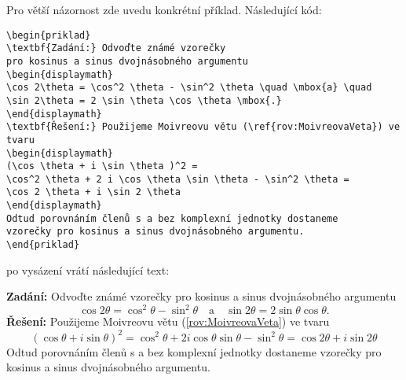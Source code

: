 Pro větší názornost zde uvedu konkrétní příklad. Následující kód:
\begin{verbatim}
\begin{priklad}
\textbf{Zadání:} Odvoďte známé vzorečky
pro kosinus a sinus dvojnásobného argumentu
\begin{displaymath}
\cos 2\theta = \cos^2 \theta - \sin^2 \theta \quad \mbox{a} \quad
\sin 2\theta = 2 \sin \theta \cos \theta \mbox{.}
\end{displaymath}
\textbf{Řešení:} Použijeme Moivreovu větu (\ref{rov:MoivreovaVeta}) ve tvaru
\begin{displaymath}
(\cos \theta + i \sin \theta )^2 =
\cos^2 \theta + 2 i \cos \theta \sin \theta - \sin^2 \theta =
\cos 2 \theta + i \sin 2 \theta
\end{displaymath}
Odtud porovnáním členů s a bez komplexní jednotky dostaneme
vzorečky pro kosinus a sinus dvojnásobného argumentu.
\end{priklad}
\end{verbatim}
po vysázení vrátí následující text:
\begin{priklad}
\textbf{Zadání:} Odvoďte známé vzorečky pro kosinus a sinus dvojnásobného argumentu
\begin{displaymath}
\cos 2\theta = \cos^2 \theta - \sin^2 \theta \quad \mbox{a} \quad
\sin 2\theta = 2 \sin \theta \cos \theta \mbox{.}
\end{displaymath}
\textbf{Řešení:} Použijeme Moivreovu větu (\ref{rov:MoivreovaVeta}) ve tvaru
\begin{displaymath}
(\cos \theta + i \sin \theta )^2 = \cos^2 \theta + 2 i \cos \theta \sin \theta - \sin^2 \theta = \cos 2 \theta + i \sin 2 \theta
\end{displaymath}
Odtud porovnáním členů s a bez komplexní jednotky dostaneme vzorečky pro kosinus a sinus dvojnásobného argumentu.
\end{priklad}